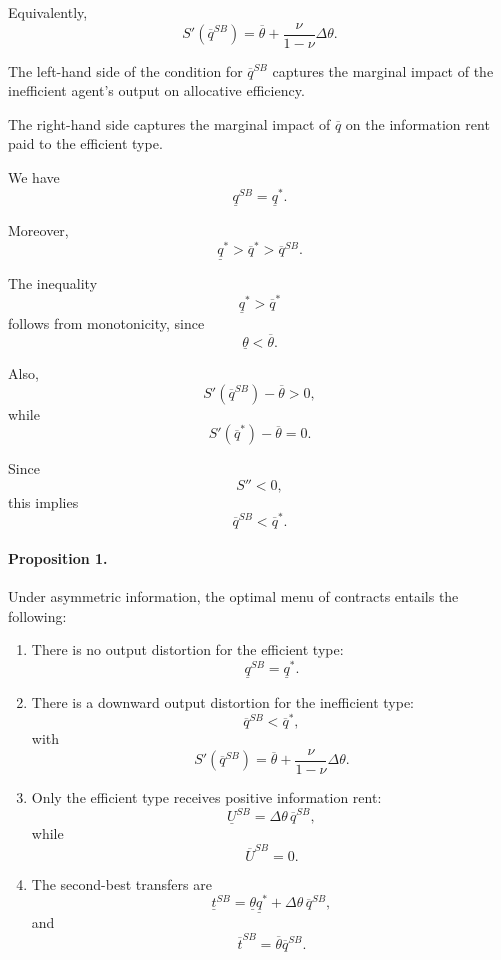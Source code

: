 Equivalently,
\[
S'(\overline q^{SB})
=
\overline{\theta}
+
\frac{\nu}{1-\nu}\Delta\theta.
\]

The left-hand side of the condition for \(\overline q^{SB}\) captures the marginal impact of the inefficient agent's output on allocative efficiency.

The right-hand side captures the marginal impact of \(\overline q\) on the information rent paid to the efficient type.

We have
\[
\underline q^{SB}
=
\underline q^*.
\]

Moreover,
\[
\underline q^*>\overline q^*>\overline q^{SB}.
\]

The inequality
\[
\underline q^*>\overline q^*
\]
follows from monotonicity, since
\[
\underline{\theta}<\overline{\theta}.
\]

Also,
\[
S'(\overline q^{SB})-\overline{\theta}>0,
\]
while
\[
S'(\overline q^*)-\overline{\theta}=0.
\]

Since
\[
S''<0,
\]
this implies
\[
\overline q^{SB}<\overline q^*.
\]

\paragraph{Proposition 1.}

Under asymmetric information, the optimal menu of contracts entails the following:

\begin{enumerate}
    \item There is no output distortion for the efficient type:
    \[
    \underline q^{SB}=\underline q^*.
    \]

    \item There is a downward output distortion for the inefficient type:
    \[
    \overline q^{SB}<\overline q^*,
    \]
    with
    \[
    S'(\overline q^{SB})
    =
    \overline{\theta}
    +
    \frac{\nu}{1-\nu}\Delta\theta.
    \]

    \item Only the efficient type receives positive information rent:
    \[
    \underline U^{SB}
    =
    \Delta\theta\,\overline q^{SB},
    \]
    while
    \[
    \overline U^{SB}=0.
    \]

    \item The second-best transfers are
    \[
    \underline t^{SB}
    =
    \underline{\theta}\underline q^*
    +
    \Delta\theta\,\overline q^{SB},
    \]
    and
    \[
    \overline t^{SB}
    =
    \overline{\theta}\overline q^{SB}.
    \]
\end{enumerate}

